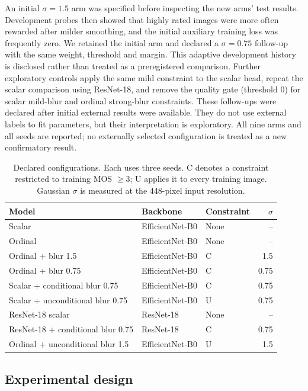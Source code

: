 \documentclass[11pt]{article}
\begin{document}
An initial $\sigma=1.5$ arm was specified before inspecting the new arms' test results. Development probes then showed that highly rated images were more often rewarded after milder smoothing, and the initial auxiliary training loss was frequently zero. We retained the initial arm and declared a $\sigma=0.75$ follow-up with the same weight, threshold and margin. This adaptive development history is disclosed rather than treated as a preregistered comparison. Further exploratory controls apply the same mild constraint to the scalar head, repeat the scalar comparison using ResNet-18, and remove the quality gate (threshold 0) for scalar mild-blur and ordinal strong-blur constraints. These follow-ups were declared after initial external results were available. They do not use external labels to fit parameters, but their interpretation is exploratory. All nine arms and all seeds are reported; no externally selected configuration is treated as a new confirmatory result.
\begin{table}[ht]\centering\small
\caption{Declared configurations. Each uses three seeds. C denotes a constraint restricted to training MOS $\geq3$; U applies it to every training image. Gaussian $\sigma$ is measured at the 448-pixel input resolution.}
\begin{tabular}{lllr}\toprule Model & Backbone & Constraint & $\sigma$ \\ \midrule
Scalar & EfficientNet-B0 & None & -- \\
Ordinal & EfficientNet-B0 & None & -- \\
Ordinal + blur 1.5 & EfficientNet-B0 & C & 1.5 \\
Ordinal + blur 0.75 & EfficientNet-B0 & C & 0.75 \\
Scalar + conditional blur 0.75 & EfficientNet-B0 & C & 0.75 \\
Scalar + unconditional blur 0.75 & EfficientNet-B0 & U & 0.75 \\
ResNet-18 scalar & ResNet-18 & None & -- \\
ResNet-18 + conditional blur 0.75 & ResNet-18 & C & 0.75 \\
Ordinal + unconditional blur 1.5 & EfficientNet-B0 & U & 1.5 \\
\bottomrule\end{tabular}\label{tab:design}\end{table}
\subsection{Experimental design}
\end{document}
